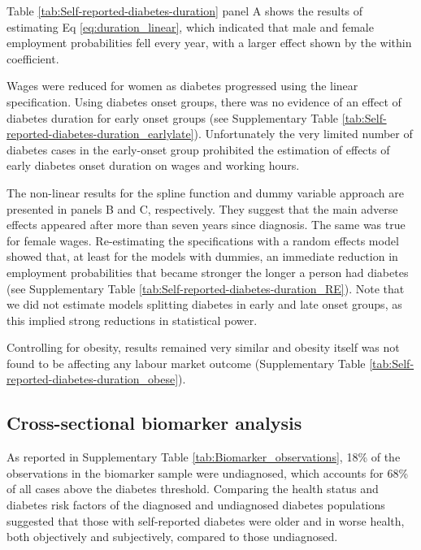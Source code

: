 \documentclass[12pt,english]{article}
\begin{document}
Table \ref{tab:Self-reported-diabetes-duration} panel A shows the results of estimating Eq \ref{eq:duration_linear}, which indicated that male and female employment probabilities fell every year, with a larger effect shown by the within coefficient.



Wages were reduced for women as diabetes progressed using the linear specification. Using diabetes onset groups, there was no evidence of an effect of diabetes duration for early onset groups (see Supplementary Table \ref{tab:Self-reported-diabetes-duration_earlylate}). Unfortunately the very limited number of diabetes cases in the early-onset group prohibited the estimation of effects of early diabetes onset duration on wages and working hours.


The non-linear results for the spline function and dummy variable approach are  presented in panels B and C, respectively. They suggest that the main adverse effects appeared after more than seven years since diagnosis. The same was true for female wages. Re-estimating the specifications with a random effects model showed that, at least for the models with dummies, an immediate reduction in employment probabilities that became stronger the longer a person had diabetes (see Supplementary Table \ref{tab:Self-reported-diabetes-duration_RE}). Note that we did not estimate models splitting diabetes in early and late onset groups, as this implied strong reductions in statistical power.

Controlling for obesity, results remained very similar and obesity itself was not found to be affecting any labour market outcome (Supplementary Table \ref{tab:Self-reported-diabetes-duration_obese}).



\FloatBarrier

\subsection{Cross-sectional biomarker analysis}


As reported in Supplementary Table \ref{tab:Biomarker_observations}, 18\% of the observations in the biomarker sample were undiagnosed, which accounts for 68\% of all cases above the diabetes threshold. Comparing the health status and diabetes risk factors of the diagnosed and undiagnosed diabetes populations suggested that those with self-reported diabetes were older and in worse health, both objectively and subjectively, compared to those undiagnosed.
\end{document}
